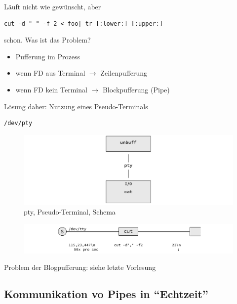 				Läuft nicht wie gewünscht, aber
			
				\lstShell
				\begin{lstlisting}
cut -d " " -f 2 < foo| tr [:lower:] [:upper:]
				\end{lstlisting}

				schon. Was ist das Problem?

				\begin{itemize}
					\item Pufferung im Prozess
					\item wenn FD aus Terminal $\rightarrow$ Zeilenpufferung
					\item wenn FD kein Terminal $\rightarrow$ Blockpufferung (Pipe)
				\end{itemize}

				Lösung daher: Nutzung eines Pseudo-Terminals

				\lstShell
				\begin{lstlisting}
/dev/pty
				\end{lstlisting}

				\begin{figure}[hbtp]
					\caption{pty, Pseudo-Terminal, Schema}
					\includegraphics[width=\textwidth]{workfiles/v4_2}
				\end{figure}

				\begin{figure}[hbtp]
					\includegraphics[width=\textwidth]{workfiles/v5_1}
				\end{figure}

				Problem der Blogpufferung: siehe letzte Vorlesung




		\subsection*{Kommunikation vo Pipes in "`Echtzeit"'} %
		\label{sub:kommunikation_vo_pipes_in_}

